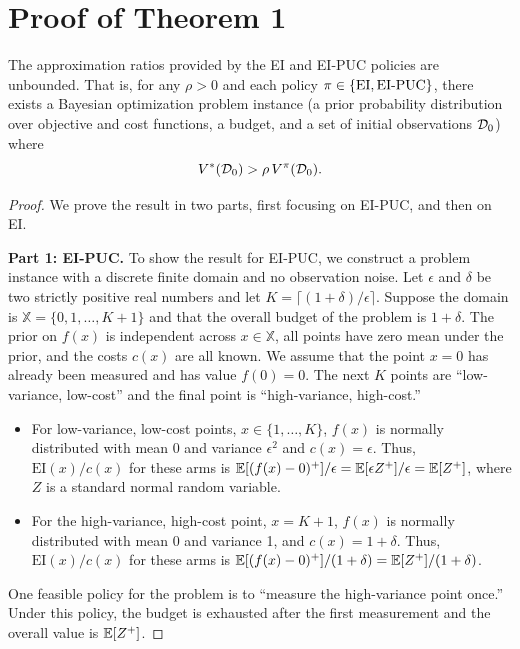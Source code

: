 \section{Proof of Theorem 1}
\label{supp:thm1}
\begin{theorem}
\label{prop:counterexample}
The approximation ratios provided by the EI and EI-PUC policies are unbounded. That is, for any $\rho > 0$ and each policy $\pi\in\{\mathrm{EI}, \mathrm{EI\textnormal{-}PUC}\}$, there exists a Bayesian optimization problem instance (a  prior probability distribution over objective and cost functions, a budget, and a set of initial observations $\mathcal{D}_0$) where 
\[ V^*(\mathcal{D}_0) > \rho \, V^{\pi}(\mathcal{D}_0). \]
\end{theorem}
\begin{proof}
We prove the result in two parts, first focusing on EI-PUC, and then on EI.

\textbf{Part 1: EI-PUC.}
To show the result for EI-PUC, we construct a problem instance with a discrete finite domain and no observation noise. Let $\epsilon$ and $\delta$ be two strictly positive real numbers and let $K = \lceil (1+\delta)/\epsilon \rceil$. Suppose the domain is $\mathbb X = \{0, 1, \ldots, K+1\}$ and that the overall budget of the problem is $1+\delta$. The prior on $f(x)$ is independent across $x \in \mathbb X$, all points have zero mean under the prior, and the costs $c(x)$ are all known. We assume that the point $x=0$ has already been measured and has value $f(0)=0$.
The next $K$ points are ``low-variance, low-cost'' and the final point is ``high-variance, high-cost.''
\begin{itemize}
    \item For low-variance, low-cost points, $x \in \{1,\ldots,K\}$, $f(x)$ is normally distributed with mean 0 and variance $\epsilon^2$ and $c(x) = \epsilon$. Thus, $\mathrm{EI}(x) / c(x)$ for these arms is $\mathbb{E}[(f(x) - 0)^+] / \epsilon = \mathbb{E}[\epsilon Z^+] / \epsilon = \mathbb{E}[Z^+]$, where $Z$ is a standard normal random variable.
    \item For the high-variance, high-cost point, $x = K+1$, $f(x)$ is normally distributed with mean 0 and variance 1, and $c(x) = 1+\delta$. Thus, $\mathrm{EI}(x) / c(x)$ for these arms is $\mathbb{E}[(f(x) - 0)^+] / (1+\delta) = \mathbb{E}[Z^+] / (1+\delta)$.
\end{itemize}

One feasible policy for the problem is to ``measure the high-variance point once.'' Under this policy, the budget is exhausted after the first measurement and the overall value is $\mathbb{E}[Z^+]$. 


\end{proof}

